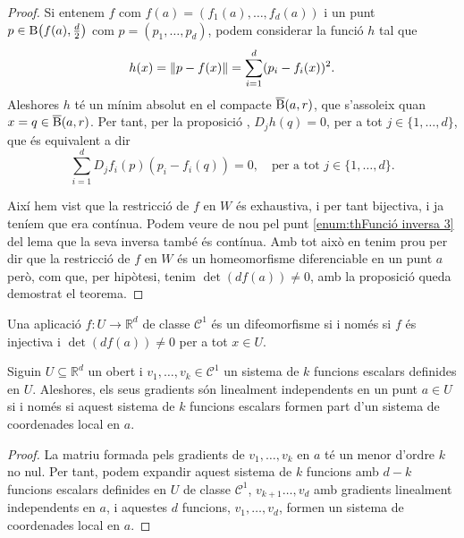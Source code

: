 \documentclass[../Apunts.tex]{subfiles}
\begin{document}
\begin{theorem}
\begin{proof}
			Si entenem \(f\) com \(f(a)=(f_{1}(a),\dots,f_{d}(a))\) i un punt \(p\in\B\left(f(a),\tfrac{d}{2}\right)\) com \(p=(p_{1},\dots,p_{d})\), podem considerar la funció \(h\) tal que
			\[h(x)=\norm{p-f(x)}=\sum_{i=1}^{d}(p_{i}-f_{i}(x))^{2}.\]
			Aleshores \(h\) té un mínim absolut en el compacte \(\overline{\operatorname{B}}(a,r)\), que s'assoleix quan \(x=q\in\overline{\operatorname{B}}(a,r)\). Per tant, per la proposició , \(D_{j}h(q)=0\), per a tot \(j\in\{1,\dots,d\}\), que és equivalent a dir
			\[\sum_{i=1}^{d}D_{j}f_{i}(p)(p_{i}-f_{i}(q))=0,\quad\text{per a tot }j\in\{1,\dots,d\}.\]
			
			Així hem vist que la restricció de \(f\) en \(W\) és exhaustiva, i per tant bijectiva, i ja teníem que era contínua. Podem veure de nou pel punt \eqref{enum:thFunció inversa 3} del lema  que la seva inversa també és contínua. Amb tot això en tenim prou per dir que la restricció de \(f\) en \(W\) és un homeomorfisme diferenciable en un punt \(a\) però, com que, per hipòtesi, tenim \(\det(df(a))\neq0\), amb la proposició  queda demostrat el teorema.
		\end{proof}
	\end{theorem}
	\begin{corollary} %
		\label{cor:difeomorfisme és equivalent a ser injectiva i tenir diferencial amb determinant no nul}
		Una aplicació \(f\colon U\to \mathbb{R}^{d}\) de classe \(\mathcal{C}^{1}\) és un difeomorfisme si i només si \(f\) és injectiva i \(\det(df(a))\neq0\) per a tot \(x\in U\).
	\end{corollary}
	\begin{proposition}
		Siguin \(U\subseteq\mathbb{R}^{d}\) un obert i \(v_{1},\dots,v_{k}\in\mathcal{C}^{1}\) un sistema de \(k\) funcions escalars definides en \(U\). Aleshores, els seus gradients són linealment independents en un punt \(a\in U\) si i només si aquest sistema de \(k\) funcions escalars formen part d'un sistema de coordenades local en \(a\).
		\begin{proof}
			La matriu formada pels gradients de \(v_{1},\dots,v_{k}\) en \(a\) té un menor d'ordre \(k\) no nul. Per tant, podem expandir aquest sistema de \(k\) funcions amb \(d-k\) funcions escalars definides en \(U\) de classe \(\mathcal{C}^{1}\), \(v_{k+1}\dots,v_{d}\) amb gradients linealment independents en \(a\), i aquestes \(d\) funcions, \(v_{1},\dots,v_{d}\), formen un sistema de coordenades local en \(a\).
		\end{proof}
	\end{proposition}
\end{document}
